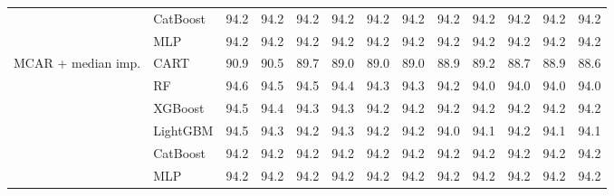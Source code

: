 \begin{table}[p]
\begin{tabular}{@{}llrrrrrrrrrrr@{}}
 & CatBoost & 94.2 & 94.2 & 94.2 & 94.2 & 94.2 & 94.2 & 94.2 & 94.2 & 94.2 & 94.2 & 94.2 \\
 & MLP & 94.2 & 94.2 & 94.2 & 94.2 & 94.2 & 94.2 & 94.2 & 94.2 & 94.2 & 94.2 & 94.2 \\
\midrule
MCAR + median imp. & CART & 90.9 & 90.5 & 89.7 & 89.0 & 89.0 & 89.0 & 88.9 & 89.2 & 88.7 & 88.9 & 88.6 \\
 & RF & 94.6 & 94.5 & 94.5 & 94.4 & 94.3 & 94.3 & 94.2 & 94.0 & 94.0 & 94.0 & 94.0 \\
 & XGBoost & 94.5 & 94.4 & 94.3 & 94.3 & 94.2 & 94.2 & 94.2 & 94.2 & 94.2 & 94.2 & 94.2 \\
 & LightGBM & 94.5 & 94.3 & 94.2 & 94.3 & 94.2 & 94.2 & 94.0 & 94.1 & 94.2 & 94.1 & 94.1 \\
 & CatBoost & 94.2 & 94.2 & 94.2 & 94.2 & 94.2 & 94.2 & 94.2 & 94.2 & 94.2 & 94.2 & 94.2 \\
 & MLP & 94.2 & 94.2 & 94.2 & 94.2 & 94.2 & 94.2 & 94.2 & 94.2 & 94.2 & 94.2 & 94.2 \\
\bottomrule
\end{tabular}
\end{table}

